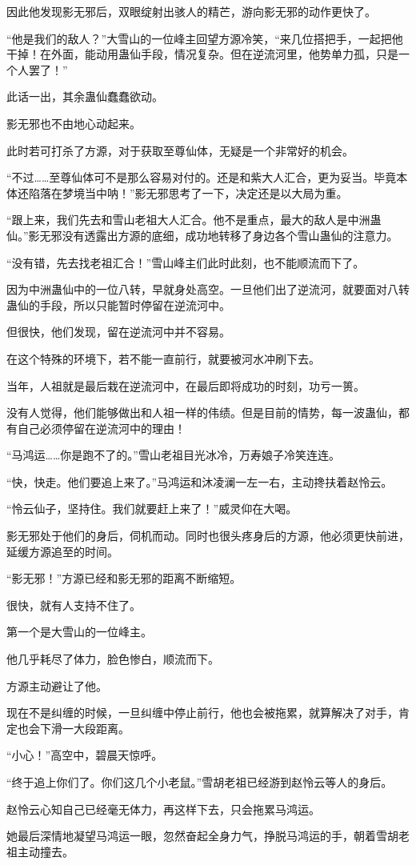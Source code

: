\begin{this_body}
因此他发现影无邪后，双眼绽射出骇人的精芒，游向影无邪的动作更快了。

“他是我们的敌人？”大雪山的一位峰主回望方源冷笑，“来几位搭把手，一起把他干掉！在外面，能动用蛊仙手段，情况复杂。但在逆流河里，他势单力孤，只是一个人罢了！”

此话一出，其余蛊仙蠢蠢欲动。

影无邪也不由地心动起来。

此时若可打杀了方源，对于获取至尊仙体，无疑是一个非常好的机会。

“不过……至尊仙体可不是那么容易对付的。还是和紫大人汇合，更为妥当。毕竟本体还陷落在梦境当中呐！”影无邪思考了一下，决定还是以大局为重。

“跟上来，我们先去和雪山老祖大人汇合。他不是重点，最大的敌人是中洲蛊仙。”影无邪没有透露出方源的底细，成功地转移了身边各个雪山蛊仙的注意力。

“没有错，先去找老祖汇合！”雪山峰主们此时此刻，也不能顺流而下了。

因为中洲蛊仙中的一位八转，早就身处高空。一旦他们出了逆流河，就要面对八转蛊仙的手段，所以只能暂时停留在逆流河中。

但很快，他们发现，留在逆流河中并不容易。

在这个特殊的环境下，若不能一直前行，就要被河水冲刷下去。

当年，人祖就是最后栽在逆流河中，在最后即将成功的时刻，功亏一篑。

没有人觉得，他们能够做出和人祖一样的伟绩。但是目前的情势，每一波蛊仙，都有自己必须停留在逆流河中的理由！

“马鸿运……你是跑不了的。”雪山老祖目光冰冷，万寿娘子冷笑连连。

“快，快走。他们要追上来了。”马鸿运和沐凌澜一左一右，主动搀扶着赵怜云。

“怜云仙子，坚持住。我们就要赶上来了！”威灵仰在大喝。

影无邪处于他们的身后，伺机而动。同时也很头疼身后的方源，他必须更快前进，延缓方源追至的时间。

“影无邪！”方源已经和影无邪的距离不断缩短。

很快，就有人支持不住了。

第一个是大雪山的一位峰主。

他几乎耗尽了体力，脸色惨白，顺流而下。

方源主动避让了他。

现在不是纠缠的时候，一旦纠缠中停止前行，他也会被拖累，就算解决了对手，肯定也会下滑一大段距离。

“小心！”高空中，碧晨天惊呼。

“终于追上你们了。你们这几个小老鼠。”雪胡老祖已经游到赵怜云等人的身后。

赵怜云心知自己已经毫无体力，再这样下去，只会拖累马鸿运。

她最后深情地凝望马鸿运一眼，忽然奋起全身力气，挣脱马鸿运的手，朝着雪胡老祖主动撞去。

\end{this_body}

